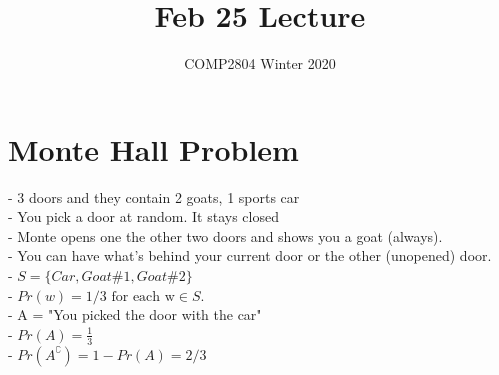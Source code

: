 \documentclass[a4paper,12pt]{article}
\title{Feb 25 Lecture}
\author{COMP2804 Winter 2020}
\begin{document}
\section{Monte Hall Problem}
  - 3 doors and they contain 2 goats, 1 sports car \\ 
  - You pick a door at random. It stays closed \\ 
  - Monte opens one the other two doors and shows you a goat (always). \\ 
  - You can have what's behind your current door or the other (unopened)  door. \\
  - $S = \{Car, Goat\#1, Goat\#2 \}$ \\
  - $Pr(w) = 1/3 \text{ for each w} \in S.$\\ 
  - A = "You picked the door with the car"\\
  - $Pr(A) = \frac{1}{3}$ \\
  - $Pr(A^\complement) = 1 - Pr(A) = 2/3$\\
\end{document}
